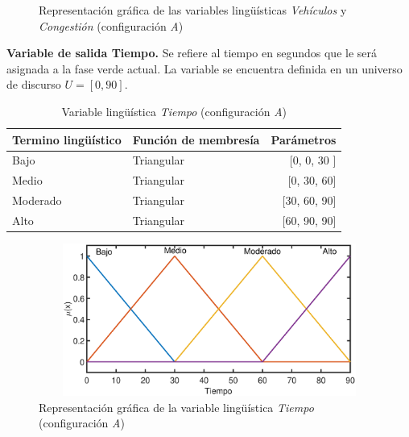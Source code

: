 \begin{figure}[H]
	\centering
	\caption{Representación gráfica de las variables lingüísticas \textit{Vehículos} y \textit{Congestión} (configuración \textit{A})}
\end{figure}

\newpage
\textbf{Variable de salida Tiempo.} Se refiere al tiempo en segundos que le será asignada a la fase verde actual. La variable se encuentra definida en un universo de discurso $U = [0,90]$.\\

\begin{table}[!h]
	\centering
	\begin{tabular}{llr} \toprule
		Termino lingüístico & Función de membresía & Parámetros \\ \midrule
		Bajo & Triangular & [0, 0, 30 ] \\
		Medio & Triangular & [0, 30, 60] \\
		Moderado & Triangular & [30, 60, 90] \\
		Alto & Triangular & [60, 90, 90] \\ \bottomrule
	\end{tabular}
	\caption{Variable lingüística \textit{Tiempo} (configuración \textit{A})}
\end{table}

\begin{figure}[H]
	\centering
	\includegraphics[height=5cm, width=12cm]{Variables/ConfigA_output1.eps}
	\caption{Representación gráfica de la variable lingüística \textit{Tiempo} (configuración \textit{A})}
\end{figure}

